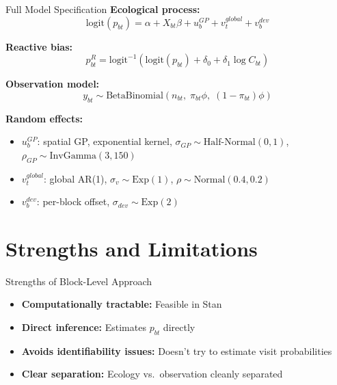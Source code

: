 \documentclass[aspectratio=169]{beamer}
\begin{document}
\begin{frame}{Full Model Specification}
  \textbf{Ecological process:}
  \begin{equation*}
    \text{logit}(p_{bt}) = \alpha + X_{bt}\beta + u_b^{GP} + v_t^{global} + v_b^{dev}
  \end{equation*}

  \textbf{Reactive bias:}
  \begin{equation*}
    p_{bt}^R = \text{logit}^{-1}\!\left(\text{logit}(p_{bt}) + \delta_0 + \delta_1 \log C_{bt}\right)
  \end{equation*}

  \textbf{Observation model:}
  \begin{equation*}
    y_{bt} \sim \text{BetaBinomial}(n_{bt},\; \pi_{bt}\phi,\; (1-\pi_{bt})\phi)
  \end{equation*}

  \textbf{Random effects:}
  \begin{itemize}
    \item $u_b^{GP}$: spatial GP, exponential kernel, $\sigma_{GP} \sim \text{Half-Normal}(0,1)$, $\rho_{GP} \sim \text{InvGamma}(3,150)$
    \item $v_t^{global}$: global AR(1), $\sigma_v \sim \text{Exp}(1)$, $\rho \sim \text{Normal}(0.4, 0.2)$
    \item $v_b^{dev}$: per-block offset, $\sigma_{dev} \sim \text{Exp}(2)$
  \end{itemize}
\end{frame}

\section{Strengths and Limitations}

\begin{frame}{Strengths of Block-Level Approach}
  \begin{itemize}
    \item \textbf{Computationally tractable:} Feasible in Stan
    \item \textbf{Direct inference:} Estimates $p_{bt}$ directly
    \item \textbf{Avoids identifiability issues:} Doesn't try to estimate visit probabilities
    \item \textbf{Clear separation:} Ecology vs.\ observation cleanly separated
  \end{itemize}
\end{frame}
\end{document}

